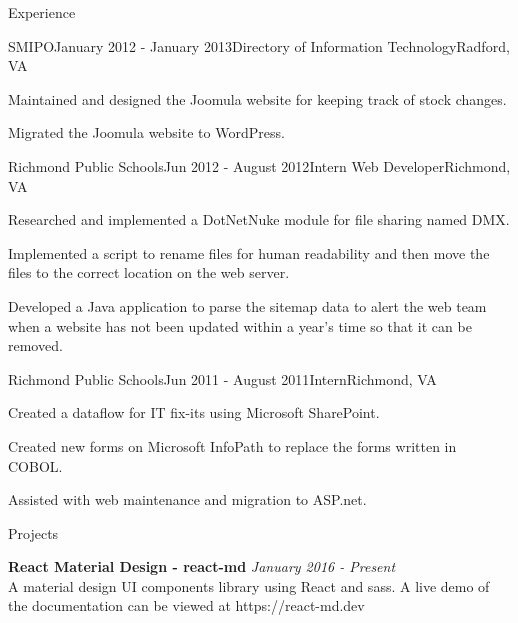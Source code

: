 \documentclass{resume} %
\begin{document}
\begin{rSection}{Experience}

	\begin{rSubsection}{SMIPO}{January 2012 - January 2013}{Directory of Information Technology}{Radford, VA}
		\item Maintained and designed the Joomula website for keeping track of stock changes.
		\item Migrated the Joomula website to WordPress.
	\end{rSubsection}


	\begin{rSubsection}{Richmond Public Schools}{Jun 2012 - August 2012}{Intern Web Developer}{Richmond, VA}
		\item Researched and implemented a DotNetNuke module for file sharing named DMX.
		\item Implemented a script to rename files for human readability and then move the files to the correct location on the web server.
		\item Developed a Java application to parse the sitemap data to alert the web team when a website has not been updated within a year's time so that it can be removed.
	\end{rSubsection}


	\begin{rSubsection}{Richmond Public Schools}{Jun 2011 - August 2011}{Intern}{Richmond, VA}
		\item Created a dataflow for IT fix-its using Microsoft SharePoint.
		\item Created new forms on Microsoft InfoPath to replace the forms written in COBOL.
		\item Assisted with web maintenance and migration to ASP.net.
	\end{rSubsection}

\end{rSection}

\begin{rSection}{Projects}

	{\bf React Material Design - react-md} \hfill {\em January 2016 - Present} \\

	A material design UI components library using React and sass. A live demo of the documentation can be viewed at https://react-md.dev \\

\end{rSection}
\end{document}
